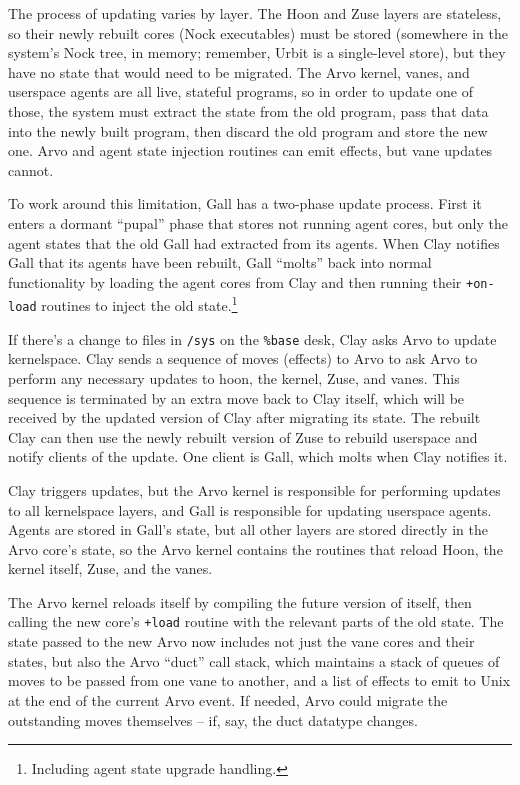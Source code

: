 \documentclass[twoside]{article}
\begin{document}
The process of updating varies by layer. The Hoon and Zuse layers are stateless, so their newly rebuilt cores (Nock executables) must be stored (somewhere in the system’s Nock tree, in memory; remember, Urbit is a single-level store), but they have no state that would need to be migrated. The Arvo kernel, vanes, and userspace agents are all live, stateful programs, so in order to update one of those, the system must extract the state from the old program, pass that data into the newly built program, then discard the old program and store the new one. Arvo and agent state injection routines can emit effects, but vane updates cannot.

To work around this limitation, Gall has a two-phase update process. First it enters a dormant ``pupal'' phase that stores not running agent cores, but only the agent states that the old Gall had extracted from its agents. When Clay notifies Gall that its agents have been rebuilt, Gall ``molts'' back into normal functionality by loading the agent cores from Clay and then running their \lstinline[style=inlinecode]{+on-load} routines to inject the old state.\footnote{Including agent state upgrade handling.}

If there's a change to files in \lstinline[style=inlinecode]{/sys} on the \lstinline[style=inlinecode]{%base} desk, Clay asks Arvo to update kernelspace. Clay sends a sequence of moves (effects) to Arvo to ask Arvo to perform any necessary updates to hoon, the kernel, Zuse, and vanes. This sequence is terminated by an extra move back to Clay itself, which will be received by the updated version of Clay after migrating its state. The rebuilt Clay can then use the newly rebuilt version of Zuse to rebuild userspace and notify clients of the update. One client is Gall, which molts when Clay notifies it.

Clay triggers updates, but the Arvo kernel is responsible for performing updates to all kernelspace layers, and Gall is responsible for updating userspace agents. Agents are stored in Gall's state, but all other layers are stored directly in the Arvo core's state, so the Arvo kernel contains the routines that reload Hoon, the kernel itself, Zuse, and the vanes.

The Arvo kernel reloads itself by compiling the future version of itself, then calling the new core's \lstinline[style=inlinecode]{+load} routine with the relevant parts of the old state. The state passed to the new Arvo now includes not just the vane cores and their states, but also the Arvo ``duct'' call stack, which maintains a stack of queues of moves to be passed from one vane to another, and a list of effects to emit to Unix at the end of the current Arvo event. If needed, Arvo could migrate the outstanding moves themselves – if, say, the duct datatype changes.
\end{document}
